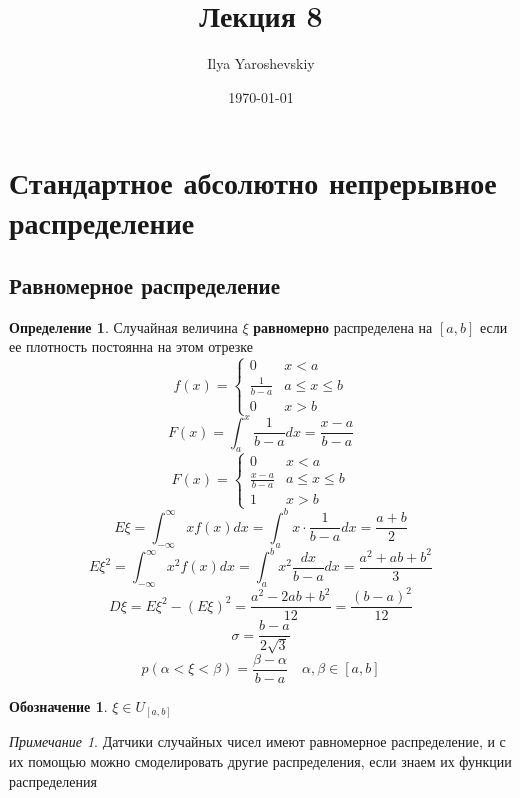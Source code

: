 \documentclass[english]{article}
\author{Ilya Yaroshevskiy}
\date{\today}
\title{Лекция 8}
\theoremstyle{plain}
\theoremstyle{remark}
\newtheorem*{remark}{Примечание}
\theoremstyle{definition}
\newtheorem*{definition}{Определение}
\newtheorem*{symb}{Обозначение}
\begin{document}
\maketitle
\tableofcontents


\section{Стандартное абсолютно непрерывное распределение}
\label{sec:org0078f01}
\subsection{Равномерное распределение}
\label{sec:org953dac2}
\begin{definition}
Случайная величина \(\xi\) \textbf{равномерно} распределена на \([a, b]\) если ее плотность постоянна на этом отрезке
\[ f(x) = \begin{cases}
0 & x < a \\
\frac{1}{b - a} & a \le x \le b \\
0 & x > b
\end{cases}\]
\[ F(x) = \int_a^x \frac{1}{b - a}dx = \frac{x - a}{b - a} \]
\[ F(x) = \begin{cases}
0 & x < a \\
\frac{x - a}{b - a} & a \le x \le b \\
1 & x > b
\end{cases} \]
\[ E\xi = \int_{-\infty}^\infty x f(x) dx = \int_a^b x \cdot \frac{1}{b - a} dx = \frac{a + b}{2} \]
\[ E\xi^2 = \int_{-\infty}^\infty x^2f(x) dx = \int_a^b x^2 \frac{dx}{b - a}dx = \frac{a^2 + ab + b^2}{3} \]
\[ D\xi = E\xi^2 - (E\xi)^2 = \frac{a^2 - 2ab + b^2}{12} = \frac{(b - a)^2}{12} \]
\[ \sigma = \frac{b - a}{2\sqrt{3}} \]
\[ p(\alpha < \xi < \beta) = \frac{\beta - \alpha}{b - a} \quad \alpha, \beta \in [a, b] \]
\end{definition}
\begin{symb}
\(\xi \in U_{[a, b]}\)
\end{symb}
\begin{remark}
Датчики случайных чисел имеют равномерное распределение, и с их помощью можно смоделировать другие распределения, если знаем их функции распределения
\end{remark}
\end{document}
